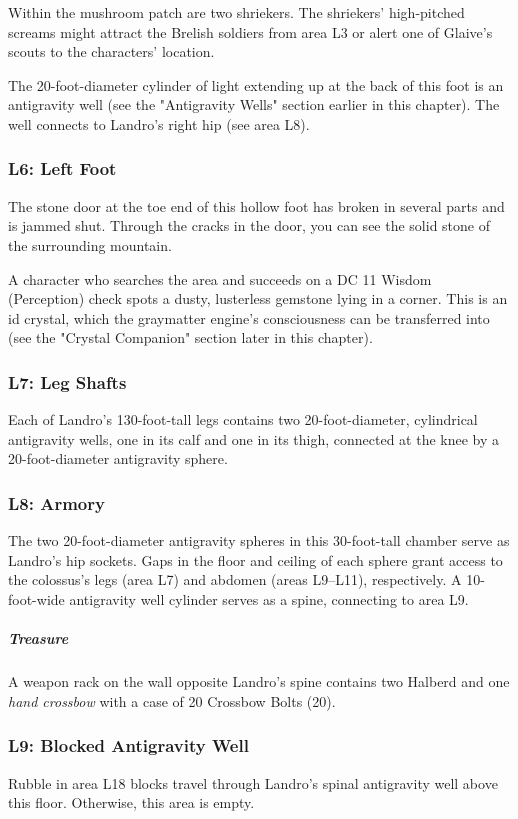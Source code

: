 \documentclass[10pt,a4paper,twoside,bg=print,twocolumn,openany,nodeprecatedcode]{dndbook}
\begin{document}
Within the mushroom patch are two shriekers. The shriekers' high-pitched screams might attract the Brelish soldiers from area L3 or alert one of Glaive's scouts to the characters' location.

The 20-foot-diameter cylinder of light extending up at the back of this foot is an antigravity well (see the "Antigravity Wells" section earlier in this chapter). The well connects to Landro's right hip (see area L8).

\subsubsection{L6: Left Foot}
\begin{DndReadAloud}{}
The stone door at the toe end of this hollow foot has broken in several parts and is jammed shut. Through the cracks in the door, you can see the solid stone of the surrounding mountain.

\end{DndReadAloud}

A character who searches the area and succeeds on a DC 11 Wisdom (Perception) check spots a dusty, lusterless gemstone lying in a corner. This is an id crystal, which the graymatter engine's consciousness can be transferred into (see the "Crystal Companion" section later in this chapter).

\subsubsection{L7: Leg Shafts}
Each of Landro's 130-foot-tall legs contains two 20-foot-diameter, cylindrical antigravity wells, one in its calf and one in its thigh, connected at the knee by a 20-foot-diameter antigravity sphere.

\subsubsection{L8: Armory}
The two 20-foot-diameter antigravity spheres in this 30-foot-tall chamber serve as Landro's hip sockets. Gaps in the floor and ceiling of each sphere grant access to the colossus's legs (area L7) and abdomen (areas L9–L11), respectively. A 10-foot-wide antigravity well cylinder serves as a spine, connecting to area L9.

\subparagraph{Treasure}
A weapon rack on the wall opposite Landro's spine contains two Halberd and one \textit{hand crossbow} with a case of 20 Crossbow Bolts (20).

\subsubsection{L9: Blocked Antigravity Well}
Rubble in area L18 blocks travel through Landro's spinal antigravity well above this floor. Otherwise, this area is empty.
\end{document}

